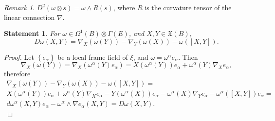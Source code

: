 \documentclass[12pt,letterpaper]{amsart}
\theoremstyle{definition}
\theoremstyle{plain}
\newtheorem{stat}{Statement}
\theoremstyle{remark}
\newtheorem{rem}{Remark}
\begin{document}
\begin{rem}
$D^2 (\omega \otimes s) = \omega \wedge R(s)$, where $R$ is the curvature tensor of the linear connection $\nabla$.
\label{rem:5}
\end{rem}
\begin{stat}
For $\omega \in \Omega^1(B) \otimes \Gamma(E)$, and $X, Y \in \mathfrak{X}(B)$,
\begin{equation}
D\omega(X, Y) = \nabla_X (\omega(Y)) - \nabla_Y (\omega(X)) - \omega([X, Y]).
\label{eq:22}
\end{equation}
\label{stat:3}
\end{stat}
\begin{proof}
Let $\left\{ e_\alpha \right\}$ be a local frame field of $\xi$, and $\omega = \omega^\alpha e_\alpha$.
Then
\begin{equation}
\nabla_X (\omega(Y) ) = \nabla_X (\omega^\alpha(Y) e_\alpha ) = X(\omega^\alpha(Y)) e_\alpha + \omega^\alpha(Y) \nabla_X e_\alpha,
\label{eq:23}
\end{equation}
therefore
\begin{multline}
\nabla_X (\omega(Y)) - \nabla_Y (\omega(X)) - \omega([X, Y]) =
\\
X(\omega^\alpha(Y)) e_\alpha + \omega^\alpha(Y) \nabla_X e_\alpha - Y(\omega^\alpha(X)) e_\alpha - \omega^\alpha(X) \nabla_Y e_\alpha - \omega^\alpha([X, Y]) e_\alpha =
\\
d\omega^\alpha(X, Y) e_\alpha - \omega^\alpha \wedge \nabla e_\alpha (X, Y) = D\omega (X, Y).
\label{eq:24}
\end{multline}
\end{proof}
\end{document}
